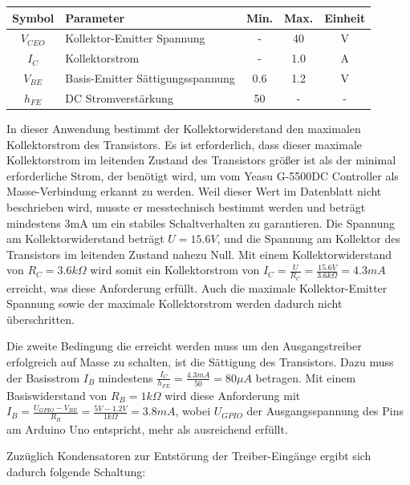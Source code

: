 \begin{tabular}{| c | l | c | c | c |}
	\hline
	\textbf{Symbol} & \textbf{Parameter} & \textbf{Min.} & \textbf{Max.} & \textbf{Einheit} \\
	\hline
	${V}_{CEO}$ & Kollektor-Emitter Spannung & - & 40 & V \\
	\hline
	${I}_{C}$ & Kollektorstrom & - & 1.0 & A \\
	\hline
	${V}_{BE}$ & Basis-Emitter Sättigungsspannung & 0.6 & 1.2 & V \\
	\hline
	${h}_{FE}$ & DC Stromverstärkung & 50 & - & - \\
	\hline
\end{tabular}

In dieser Anwendung bestimmt der Kollektorwiderstand den maximalen Kollektorstrom des Transistors. Es ist erforderlich, dass dieser maximale Kollektorstrom im leitenden Zustand des Transistors größer ist als der minimal erforderliche Strom, der benötigt wird, um vom Yeasu G-5500DC Controller als Masse-Verbindung erkannt zu werden. Weil dieser Wert im Datenblatt nicht beschrieben wird, musste er messtechnisch bestimmt werden und beträgt mindestens 3mA um ein stabiles Schaltverhalten zu garantieren. Die Spannung am Kollektorwiderstand beträgt $U=15.6V$, und die Spannung am Kollektor des Transistors im leitenden Zustand nahezu Null. Mit einem Kollektorwiderstand von $R_C=3.6k\Omega$ wird somit ein Kollektorstrom von $I_C=\frac{U}{R_C}=\frac{15.6V}{3.6k\Omega}=4.3mA$ erreicht, was diese Anforderung erfüllt. Auch die maximale Kollektor-Emitter Spannung sowie der maximale Kollektorstrom werden dadurch nicht überschritten. 

Die zweite Bedingung die erreicht werden muss um den Ausgangstreiber erfolgreich auf Masse zu schalten, ist die Sättigung des Transistors. Dazu muss der Basisstrom $I_B$ mindestens $\frac{I_C}{h_{FE}}=\frac{4.3mA}{50}=80\mu A$ betragen. Mit einem Basiswiderstand von $R_B=1k\Omega$ wird diese Anforderung mit $I_B=\frac{U_{GPIO}-V_{BE}}{R_B}=\frac{5V-1.2V}{1k\Omega}=3.8mA$, wobei $U_{GPIO}$ der Ausgangsspannung des Pins am Arduino Uno entspricht, mehr als ausreichend erfüllt. 

Zuzüglich Kondensatoren zur Entstörung der Treiber-Eingänge ergibt sich dadurch folgende Schaltung:

